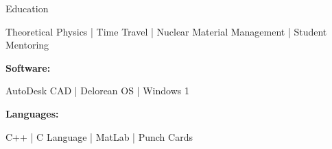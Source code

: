 \documentclass{./resume}
\begin{document}
\begin{rSection}{Education}
\begin{adjustwidth}{6em}{0pt}
  Theoretical Physics |
  Time Travel |
  Nuclear Material Management |
  Student Mentoring
  
\end{adjustwidth}


%
%
%
\vspace{-3pt}
{\bf Software:}
\vspace{-1.83em}
\begin{adjustwidth}{6em}{0pt}
  AutoDesk CAD |
  Delorean OS |
  Windows 1

\end{adjustwidth}

\end{rSection}

%
%   
%
%
%
\vspace{-0.4em}
{\bf Languages:}
\vspace{-1.83em}
\begin{adjustwidth}{6em}{0pt}
  C++ |
  C Language |
  MatLab |
  Punch Cards
\end{adjustwidth}
\end{document}
